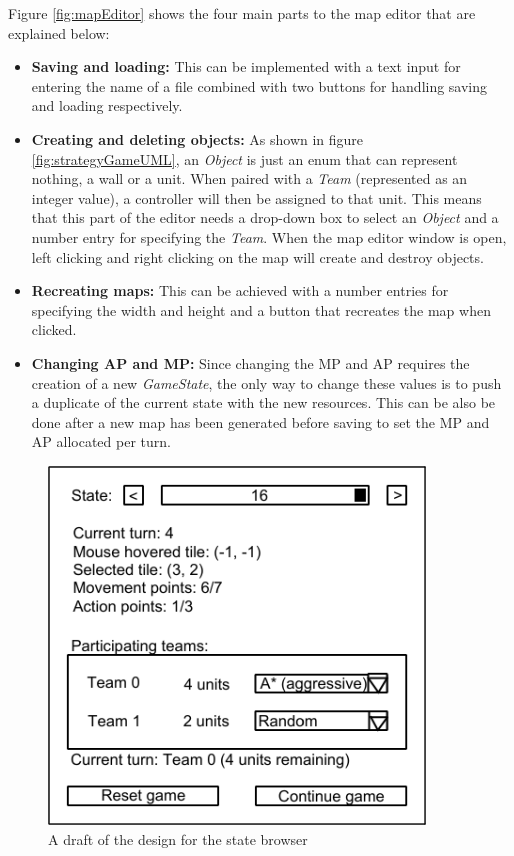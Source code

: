 \documentclass[11pt, a4paper]{report}
\begin{document}
Figure \ref{fig:mapEditor} shows the four main parts to the map editor that are explained below:
\begin{itemize}
  \item \textbf{Saving and loading:} This can be implemented with a text input for entering the name of a file combined with two buttons for handling saving and loading respectively. 
  \item \textbf{Creating and deleting objects:} As shown in figure \ref{fig:strategyGameUML}, an \emph{Object} is just an enum that can represent nothing, a wall or a unit. When paired with a \emph{Team} (represented as an integer value), a controller will then be assigned to that unit. This means that this part of the editor needs a drop-down box to select an \emph{Object} and a number entry for specifying the \emph{Team}. When the map editor window is open, left clicking and right clicking on the map will create and destroy objects.
  \item \textbf{Recreating maps:} This can be achieved with a number entries for specifying the width and height and a button that recreates the map when clicked. 
  \item \textbf{Changing AP and MP:} Since changing the MP and AP requires the creation of a new \emph{GameState}, the only way to change these values is to push a duplicate of the current state with the new resources. This can be also be done after a new map has been generated before saving to set the MP and AP allocated per turn.
\end{itemize}

\begin{figure}[!h]
  \centering
  \includegraphics[width=10cm]{img/state_browser.png}
  \caption{A draft of the design for the state browser}
  \label{fig:stateBrowser}
\end{figure}
\end{document}
